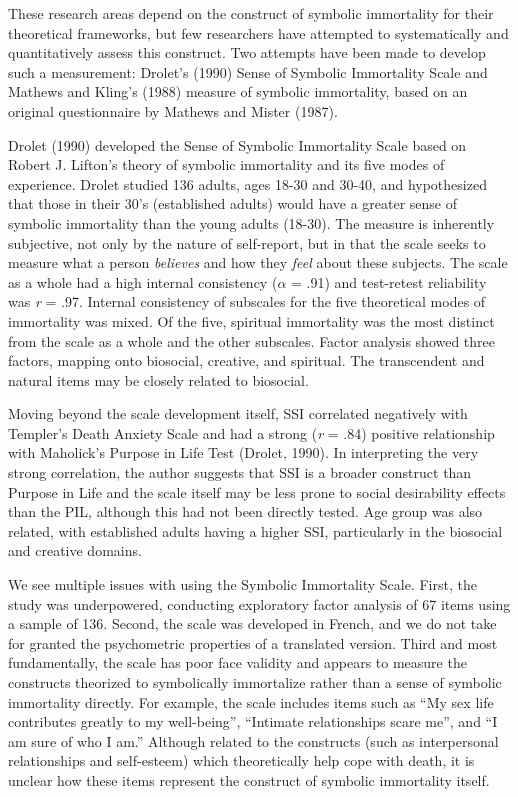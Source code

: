 \documentclass[
  man]{apa6}
\begin{document}
These research areas depend on the construct of symbolic immortality for
their theoretical frameworks, but few researchers have attempted to
systematically and quantitatively assess this construct. Two attempts
have been made to develop such a measurement: Drolet's (1990)
Sense of Symbolic Immortality Scale and Mathews and Kling's
(1988) measure of symbolic immortality, based on an original
questionnaire by Mathews and Mister (1987).

Drolet (1990) developed the Sense of Symbolic Immortality Scale
based on Robert J. Lifton's theory of symbolic immortality and its five
modes of experience. Drolet studied 136 adults, ages 18-30 and 30-40,
and hypothesized that those in their 30's (established adults) would
have a greater sense of symbolic immortality than the young adults
(18-30). The measure is inherently subjective, not only by the nature of
self-report, but in that the scale seeks to measure what a person
\emph{believes} and how they \emph{feel} about these subjects. The scale as a
whole had a high internal consistency (\(\alpha\) = .91) and test-retest
reliability was \emph{r} = .97. Internal consistency of subscales for the
five theoretical modes of immortality was mixed. Of the five, spiritual
immortality was the most distinct from the scale as a whole and the
other subscales. Factor analysis showed three factors, mapping onto
biosocial, creative, and spiritual. The transcendent and natural items
may be closely related to biosocial.

Moving beyond the scale development itself, SSI correlated negatively
with Templer's Death Anxiety Scale and had a strong (\emph{r} = .84) positive
relationship with Maholick's Purpose in Life Test (Drolet, 1990). In
interpreting the very strong correlation, the author suggests that SSI
is a broader construct than Purpose in Life and the scale itself may be
less prone to social desirability effects than the PIL, although this
had not been directly tested. Age group was also related, with
established adults having a higher SSI, particularly in the biosocial
and creative domains.

We see multiple issues with using the Symbolic Immortality Scale. First,
the study was underpowered, conducting exploratory factor analysis of 67
items using a sample of 136. Second, the scale was developed in French,
and we do not take for granted the psychometric properties of a
translated version. Third and most fundamentally, the scale has poor
face validity and appears to measure the constructs theorized to
symbolically immortalize rather than a sense of symbolic immortality
directly. For example, the scale includes items such as ``My sex life
contributes greatly to my well-being'', ``Intimate relationships scare
me'', and ``I am sure of who I am.'' Although related to the constructs
(such as interpersonal relationships and self-esteem) which
theoretically help cope with death, it is unclear how these items
represent the construct of symbolic immortality itself.
\end{document}

